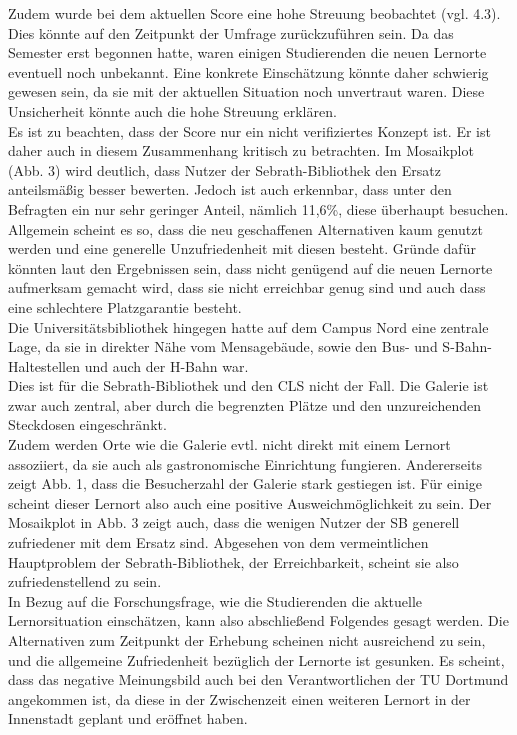 \documentclass[11pt, a4paper]{article}
\begin{document}
Zudem wurde bei dem aktuellen Score eine hohe Streuung beobachtet (vgl. 4.3). Dies könnte auf den Zeitpunkt der Umfrage zurückzuführen sein. Da das Semester erst begonnen hatte, waren einigen Studierenden die neuen Lernorte eventuell noch unbekannt. Eine konkrete Einschätzung könnte daher schwierig gewesen sein, da sie mit der aktuellen Situation noch unvertraut waren. Diese Unsicherheit könnte auch die hohe Streuung erklären.\\
Es ist zu beachten, dass der Score nur ein nicht verifiziertes Konzept ist. Er ist daher auch in diesem Zusammenhang kritisch zu betrachten.
Im Mosaikplot (Abb. 3) wird deutlich, dass Nutzer der Sebrath-Bibliothek den Ersatz anteilsmäßig besser bewerten. Jedoch ist auch erkennbar, dass unter den Befragten ein nur sehr geringer Anteil, nämlich 11,6\%, diese überhaupt besuchen.\\
Allgemein scheint es so, dass die neu geschaffenen Alternativen kaum genutzt werden und eine generelle Unzufriedenheit mit diesen besteht. Gründe dafür könnten laut den Ergebnissen sein, dass nicht genügend auf die neuen Lernorte aufmerksam gemacht wird, dass sie nicht erreichbar genug sind und auch dass eine schlechtere Platzgarantie besteht.\\
Die Universitätsbibliothek hingegen hatte auf dem Campus Nord eine zentrale Lage, da sie in direkter Nähe vom Mensagebäude, sowie den Bus- und S-Bahn-Haltestellen und auch der H-Bahn war. \\
Dies ist für die Sebrath-Bibliothek und den CLS nicht der Fall. Die Galerie ist zwar auch zentral, aber durch die begrenzten Plätze und den unzureichenden Steckdosen eingeschränkt.\\
Zudem werden Orte wie die Galerie evtl. nicht direkt mit einem Lernort assoziiert, da sie auch als gastronomische Einrichtung fungieren.
Andererseits zeigt Abb. 1, dass die Besucherzahl der Galerie stark gestiegen ist.
Für einige scheint dieser Lernort also auch eine positive Ausweichmöglichkeit zu sein.
Der Mosaikplot in Abb. 3 zeigt auch, dass die wenigen Nutzer der SB generell zufriedener mit dem Ersatz sind. Abgesehen von dem vermeintlichen Hauptproblem der Sebrath-Bibliothek, der Erreichbarkeit, scheint sie also zufriedenstellend zu sein.\\
In Bezug auf die Forschungsfrage, wie die Studierenden die aktuelle Lernorsituation einschätzen, kann also abschließend Folgendes gesagt werden. Die Alternativen zum Zeitpunkt der Erhebung scheinen nicht ausreichend zu sein, und die allgemeine Zufriedenheit bezüglich der Lernorte ist gesunken.
Es scheint, dass das negative Meinungsbild auch bei den Verantwortlichen der TU Dortmund angekommen ist, da diese in der Zwischenzeit einen weiteren Lernort in der Innenstadt geplant und eröffnet haben.
\newpage
\end{document}
